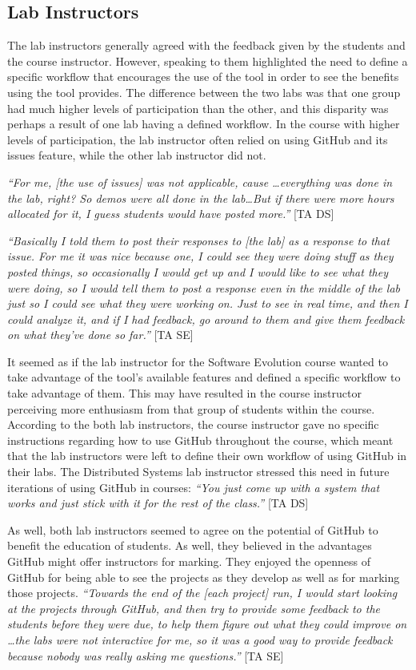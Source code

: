 \subsection{Lab Instructors}
The lab instructors generally agreed with the feedback given by the students and the course instructor. However, speaking to them highlighted the need to define a specific workflow that encourages the use of the tool in order to see the benefits using the tool provides. The difference between the two labs was that one group had much higher levels of participation than the other, and this disparity was perhaps a result of one lab having a defined workflow. In the course with higher levels of participation, the lab instructor often relied on using GitHub and its issues feature, while the other lab instructor did not.

\textit{``For me, [the use of issues] was not applicable, cause \ldots everything was done in the lab, right? So demos were all done in the lab\ldots But if there were more hours allocated for it, I guess students would have posted more.''} [TA DS]

\textit{``Basically I told them to post their responses to [the lab] as a response to that issue. For me it was nice because one, I could see they were doing stuff as they posted things, so occasionally I would get up and I would like to see what they were doing, so I would tell them to post a response even in the middle of the lab just so I could see what they were working on. Just to see in real time, and then I could analyze it, and if I had feedback, go around to them and give them feedback on what they've done so far.''} [TA SE]

It seemed as if the lab instructor for the Software Evolution course wanted to take advantage of the tool's available features and defined a specific workflow to take advantage of them. This may have resulted in the course instructor perceiving more enthusiasm from that group of students within the course. According to the both lab instructors, the course instructor gave no specific instructions regarding how to use GitHub throughout the course, which meant that the lab instructors were left to define their own workflow of using GitHub in their labs. The Distributed Systems lab instructor stressed this need in future iterations of using GitHub in courses: \textit{``You just come up with a system that works and just stick with it for the rest of the class.''} [TA DS]

As well, both lab instructors seemed to agree on the potential of GitHub to benefit the education of students. As well, they believed in the advantages GitHub might offer instructors for marking. They enjoyed the openness of GitHub for being able to see the projects as they develop as well as for marking those projects. \textit{``Towards the end of the [each project] run, I would start looking at the projects through GitHub, and then try to provide some feedback to the students before they were due, to help them figure out what they could improve on \ldots the labs were not interactive for me, so it was a good way to provide feedback because nobody was really asking me questions.''} [TA SE]

